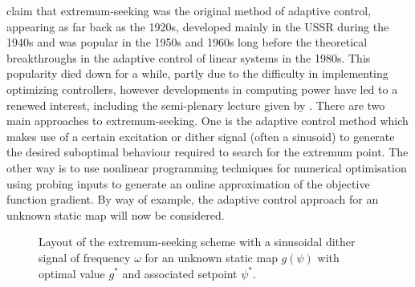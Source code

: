 \cite{ArKr03} claim that extremum-seeking was the original method of adaptive control, appearing as far back as the 1920s, developed mainly in the USSR during the 1940s and was popular in the 1950s and 1960s long before the theoretical breakthroughs in the adaptive control of linear systems in the 1980s. This popularity died down for a while, partly due to the difficulty in implementing optimizing controllers, however developments in computing power have led to a renewed interest, including the semi-plenary lecture given by \cite{Nes09}. There are two main approaches to extremum-seeking. One is the adaptive control method which makes use of a certain excitation or dither signal (often a sinusoid) to generate the desired suboptimal behaviour required to search for the extremum point. The other way is to use nonlinear programming techniques for numerical optimisation using probing inputs to generate an online approximation of the objective function gradient. By way of example, the adaptive control approach for an unknown static map will now be considered.



\begin{figure}
\centering

\caption{Layout of the extremum-seeking scheme with a sinusoidal dither signal of frequency $\omega$ for an unknown static map $g(\psi)$ with optimal value $g^*$ and associated setpoint $\psi^*$.}
\label{fig:statES}
\end{figure}

